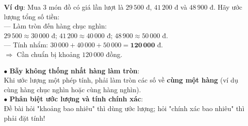 \documentclass[14pt,a4paper,oneside]{extbook}
\begin{document}
\noindent
\begin{minipage}[t]{0.53\textwidth}
  \begin{tcolorbox}[
    enhanced,
    title={\footnotesize\bfseries\color{white}\faCheckCircle\ Ví dụ thực hành chuẩn mực},
    colback=green!2!white,
    colframe=green!60!black,
    arc=2.5mm, boxrule=0.8pt, top=1.8mm, bottom=1.8mm, left=2.2mm, right=2.2mm
  ]
    \footnotesize
    \textbf{Ví dụ}: Mua 3 món đồ có giá lần lượt là $29\,500$ đ, $41\,200$ đ và $48\,900$ đ. Hãy ước lượng tổng số tiền:\\
    --- Làm tròn đến hàng chục nghìn:\\
    $29\,500 \approx 30\,000$ đ; $41\,200 \approx 40\,000$ đ; $48\,900 \approx 50\,000$ đ.\\
    --- Tính nhẩm: $30\,000 + 40\,000 + 50\,000 = \mathbf{120\,000}$ đ.\\
    $\Rightarrow$ Cần chuẩn bị khoảng $120\,000$ đồng.
  \end{tcolorbox}
\end{minipage}%
\hfill
\begin{minipage}[t]{0.45\textwidth}
  \begin{tcolorbox}[
    enhanced,
    title={\footnotesize\bfseries\color{white}\faExclamationTriangle\ Mẹo tránh bẫy trắc nghiệm},
    colback=red!2!white,
    colframe=red!70!black,
    arc=2.5mm, boxrule=0.8pt, top=1.8mm, bottom=1.8mm, left=2.2mm, right=2.2mm
  ]
    \footnotesize
    $\bullet$ \textbf{Bẫy không thống nhất hàng làm tròn}:\\
    Khi ước lượng một phép tính, phải làm tròn các số về \textbf{cùng một hàng} (ví dụ cùng hàng chục nghìn hoặc cùng hàng nghìn).\\
    $\bullet$ \textbf{Phân biệt ước lượng và tính chính xác}:\\
    Đề bài hỏi "khoảng bao nhiêu" thì dùng ước lượng; hỏi "chính xác bao nhiêu" thì phải đặt tính!
  \end{tcolorbox}
\end{minipage}
\end{document}
